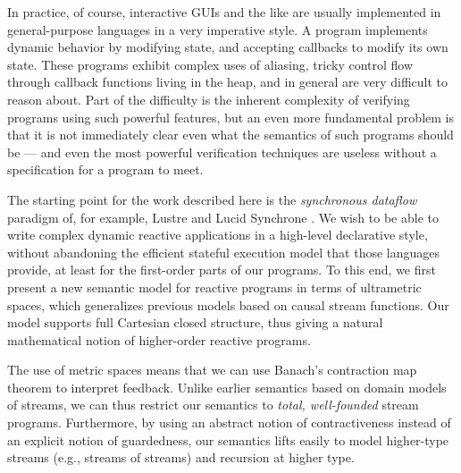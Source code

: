 \documentclass[nocopyrightspace,preprint]{sigplanconf}
\begin{document}
In practice, of course, interactive GUIs and the like are usually
implemented in general-purpose languages in a very imperative style. A
program implements dynamic behavior by modifying state, and accepting
callbacks to modify its own state. These programs exhibit complex uses
of aliasing, tricky control flow through callback functions living in
the heap, and in general are very difficult to reason about. Part of
the difficulty is the inherent complexity of verifying programs using
such powerful features, but an even more fundamental problem is that
it is not immediately clear even what the semantics of such programs
should be --- and even the most powerful verification techniques are
useless without a specification for a program to meet.

The starting point for the work described here is the
\emph{synchronous dataflow} paradigm of, for example, Lustre
\cite{lustre} and Lucid Synchrone \cite{synchrone}. We wish to be able
to write complex dynamic reactive applications in a high-level
declarative style, without abandoning the efficient stateful execution
model that those languages provide, at least for the first-order parts
of our programs. To this end, we first present a new semantic model
for reactive programs in terms of ultrametric spaces, which
generalizes previous models based on causal stream functions. Our
model supports full Cartesian closed structure, thus giving a
natural mathematical notion of higher-order reactive programs.


  The use of metric spaces means that we can use
  Banach's contraction map theorem to interpret feedback. Unlike earlier semantics based on domain models of streams, we
  can thus restrict our semantics to \emph{total, well-founded}
  stream programs. Furthermore, by using an abstract notion of
  contractiveness instead of an explicit notion of guardedness, our
  semantics lifts easily to model higher-type streams (e.g., streams
  of streams) and recursion at higher type. 
\end{document}
